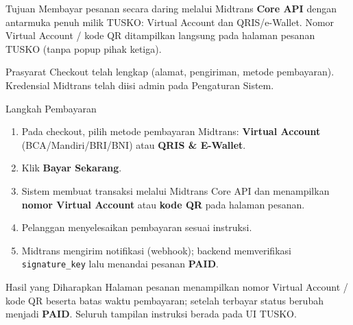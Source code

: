 
\begin{flowsection}{Tujuan}
Membayar pesanan secara daring melalui Midtrans \textbf{Core API} dengan
antarmuka penuh milik TUSKO: Virtual Account dan QRIS/e-Wallet. Nomor Virtual
Account / kode QR ditampilkan langsung pada halaman pesanan TUSKO (tanpa popup
pihak ketiga).
\end{flowsection}

\begin{flowsection}{Prasyarat}
Checkout telah lengkap (alamat, pengiriman, metode pembayaran). Kredensial
Midtrans telah diisi admin pada Pengaturan Sistem.
\end{flowsection}

\begin{flowsection}{Langkah Pembayaran}
\begin{enumerate}
  \item Pada checkout, pilih metode pembayaran Midtrans:
        \textbf{Virtual Account} (BCA/Mandiri/BRI/BNI) atau \textbf{QRIS \& E-Wallet}.
  \item Klik \textbf{Bayar Sekarang}.
  \item Sistem membuat transaksi melalui Midtrans Core API dan menampilkan
        \textbf{nomor Virtual Account} atau \textbf{kode QR} pada halaman pesanan.
  \item Pelanggan menyelesaikan pembayaran sesuai instruksi.
  \item Midtrans mengirim notifikasi (webhook); backend memverifikasi
        \texttt{signature\_key} lalu menandai pesanan \textbf{PAID}.
\end{enumerate}
\end{flowsection}


\begin{flowsection}{Hasil yang Diharapkan}
Halaman pesanan menampilkan nomor Virtual Account / kode QR beserta batas waktu
pembayaran; setelah terbayar status berubah menjadi \textbf{PAID}. Seluruh
tampilan instruksi berada pada UI TUSKO.
\end{flowsection}



